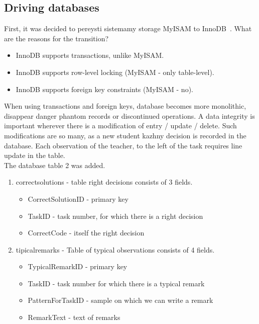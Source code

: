 \documentclass{acmtog} %
\begin{document}
\subsection{Driving databases}
First, it was decided to pereysti sistemamy storage MyISAM to InnoDB~\cite{innodb}. What are the reasons for the transition?
\begin{itemize}
\item InnoDB supports transactions, unlike MyISAM.
\item InnoDB supports row-level locking (MyISAM - only table-level).
\item InnoDB supports foreign key constraints (MyISAM - no).
\end{itemize}
When using transactions and foreign keys, database becomes more monolithic, disappear danger phantom records or discontinued operations. A data integrity is important wherever there is a modification of entry / update / delete. Such modifications are so many, as a new student kazhny decision is recorded in the database. Each observation of the teacher, to the left of the task requires line update in the table. \\
The database table 2 was added.
\begin{enumerate} 
\item correctsolutions - table right decisions consists of 3 fields. 
    \begin{itemize}
    \item CorrectSolutionID - primary key
    \item TaskID - task number, for which there is a right decision
    \item CorrectCode - itself the right decision
    \end{itemize}
\item tipicalremarks - Table of typical observations consists of 4 fields.
    \begin{itemize}
    \item TypicalRemarkID - primary key
    \item TaskID - task number for which there is a typical remark
    \item PatternForTaskID - sample on which we can write a remark
    \item RemarkText - text of remarks
    \end{itemize}
\end{enumerate}
\end{document}
